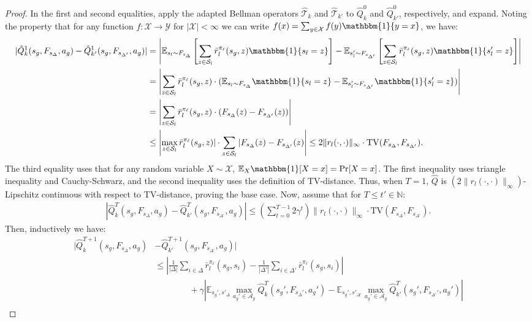 \documentclass{article}
\theoremstyle{plain}
\theoremstyle{definition}
\def\E{\mathbb{E}}
\def\N{\mathbb{N}}
\begin{document}
\begin{proof}
In the first and second equalities, apply the adapted Bellman operators $\hat{\mathcal{T}}_k$ and $\hat{\mathcal{T}}_{k'}$ to $\hat{Q}_k^0$ and $\hat{Q}_{k'}^0$, respectively, and expand.  Noting the property that for any function $f:\mathcal{X}\to\mathcal{Y}$ for $|\mathcal{X}|<\infty$ we can write $f(x) = \sum_{y\in\mathcal{X}}f(y)\mathbbm{1}\{y=x\}$, we have:
\begin{align*}
|\hat{Q}^1_k(s_g,F_{s_\Delta},a_g) - \hat{Q}_{k'}^1(s_g, F_{s_{\Delta'}}, a_g)| &= \left|\E_{s_l \sim F_{s_\Delta}}\left[\sum_{z\in \mathcal{S}_l}\bar{r}^{\pi_\ell}_l(s_g, z)\mathbbm{1}\{s_l = z\}\right] - \E_{s_l' \sim F_{s_{\Delta'}}}\left[\sum_{z\in\mathcal{S}_l}\bar{r}^{\pi_\ell}_l(s_g, z)\mathbbm{1}\{s_l' = z\}\right]\right| \\
&= \left|\sum_{z\in\mathcal{S}_l}\bar{r}^{\pi_\ell}_l(s_g,z)\cdot (\E_{s_l\sim F_{s_\Delta}}\mathbbm{1}\{s_l=z\} - \E_{s_l'\sim F_{s_{\Delta'}}}\mathbbm{1}\{s_l'=z\})\right| \\
&= \left|\sum_{z\in\mathcal{S}_l}\bar{r}^{\pi_\ell}_l(s_g,z)\cdot (F_{s_\Delta}(z) - F_{s_{\Delta'}}(z))\right|  \\
&\leq \left|\max_{z\in\mathcal{S}_l}\bar{r}^{\pi_\ell}_l(s_g,z)|\cdot \sum_{z\in\mathcal{S}_l}|F_{s_\Delta}(z) - F_{s_{\Delta'}}(z)\right| \leq 2\|r_l(\cdot,\cdot)\|_\infty \cdot \mathrm{TV}(F_{s_\Delta}, F_{s_{\Delta'}}).
\end{align*}
The third equality uses that for any random variable $X\sim\mathcal{X}$, $\E_X\mathbbm{1}[X=x]=\Pr[X=x]$. The first inequality uses triangle inequality and Cauchy-Schwarz, and the second inequality uses the definition of TV-distance. Thus, when $T=1$, $\hat{Q}$ is $(2\|r_l(\cdot,\cdot)\|_\infty)$-Lipschitz continuous with respect to TV-distance, proving the base case. Now, assume that for $T\leq t'\in\N$:
\begin{align*}\left|\hat{Q}^{T}_k(s_g,F_{s_\Delta}, a_g) - \hat{Q}_{k'}^{T}(s_g,F_{s_{\Delta'}}, a_g)\right| \leq \left(\sum_{t=0}^{T-1}2\gamma^t\right)\|r_l(\cdot,\cdot)\|_\infty\cdot\mathrm{TV}\left(F_{s_\Delta}, F_{s_{\Delta'}}\right).\end{align*}
Then, inductively we have:
\begin{align*}
    |\hat{Q}_k^{T+1}(s_g,F_{s_\Delta}, a_g) &- \hat{Q}_{k'}^{T+1}(s_g,F_{s_{\Delta'}}, a_g)|\\
&\leq\left|\frac{1}{|\Delta|}\sum_{i\in\Delta}\bar{r}^{\pi_\ell}_l(s_g,s_i)-\frac{1}{|\Delta'|}\sum_{i\in\Delta'}\bar{r}^{\pi_\ell}_l(s_g,s_i)\right| \\
&\quad\quad\quad\quad +\gamma\left|\E_{s_g', s'_{\Delta}}\max_{a_g'\in\mathcal{A}_g}\hat{Q}_k^{T}(s_g',F_{s_\Delta'}, a_g')-\E_{s_g', s'_{\Delta'}}\max_{a_g'\in\mathcal{A}_g}\hat{Q}_{k'}^{T}(s_g',F_{s_{\Delta'}'}, a_g')\right| \\

\end{align*}
\end{proof}
\end{document}
